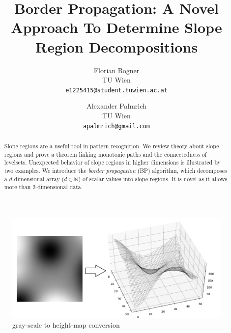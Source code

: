 \documentclass[11pt,twoside,twocolumn,a4paper]{article}
\theoremstyle{plain}
\theoremstyle{definition}
\begin{document}
\title{Border Propagation: A Novel Approach To Determine Slope Region Decompositions}


\author{Florian Bogner\\
TU Wien\\
{\tt\small e1225415@student.tuwien.ac.at}
\and
Alexander Palmrich\\
TU Wien\\
{\tt\small apalmrich@gmail.com}
}


\maketitle
\ifacvrwfinal\thispagestyle{fancy}\fi


\begin{abstract}
Slope regions are a useful tool in pattern recognition. We review theory about slope regions and prove a theorem linking monotonic paths and the connectedness of levelsets. Unexpected behavior of slope regions in higher dimensions is illustrated by two examples. We introduce the \emph{border propagation} (BP) algorithm, which decomposes a $d$-dimensional array ($d \in \mathbb N$) of scalar values into slope regions. It is novel as it allows more than 2-dimensional data.
\end{abstract}


\begin{figure}[H]
\centering
\includegraphics[width=\columnwidth]{img/visu1.png}
\caption{gray-scale to height-map conversion}
\label{fig:conversion}
\end{figure}
\end{document}
